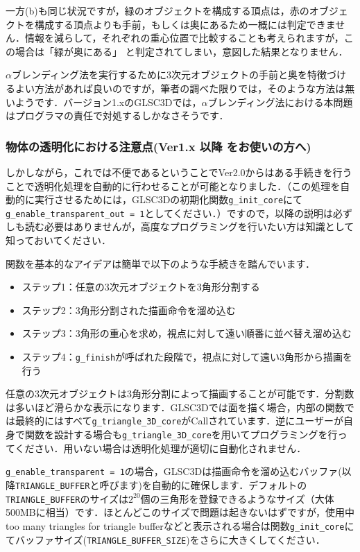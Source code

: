 \documentclass[platex,a4paper,12pt]{jsarticle}%
\begin{document}
一方(b)も同じ状況ですが，緑のオブジェクトを構成する頂点は，赤のオブジェクトを構成する頂点よりも手前，もしくは奥にあるため一概には判定できません．情報を減らして，それぞれの重心位置で比較することも考えられますが，この場合は「緑が奥にある」
と判定されてしまい，意図した結果となりません．

$\alpha$ブレンディング法を実行するために3次元オブジェクトの手前と奥を特徴づけるよい方法があれば良いのですが，筆者の調べた限りでは，そのような方法は無いようです．バージョン1.xのGLSC3Dでは，$\alpha$ブレンディング法における本問題はプログラマの責任で対処するしかなさそうです．

\subsubsection{物体の透明化における注意点(Ver1.x 以降 をお使いの方へ)}

しかしながら，これでは不便であるということでVer2.0からはある手続きを行うことで透明化処理を自動的に行わせることが可能となりました．（この処理を自動的に実行させるためには，GLSC3Dの初期化関数\verb|g_init_core|にて\verb|g_enable_transparent_out = 1|としてください．）ですので，以降の説明は必ずしも読む必要はありませんが，高度なプログラミングを行いたい方は知識として知っておいてください．

関数を基本的なアイデアは簡単で以下のような手続きを踏んでいます．
\begin{itemize}
\item ステップ1：任意の3次元オブジェクトを3角形分割する
\item ステップ2：3角形分割された描画命令を溜め込む
\item ステップ3：3角形の重心を求め，視点に対して遠い順番に並べ替え溜め込む
\item ステップ4：\verb|g_finish|が呼ばれた段階で，視点に対して遠い3角形から描画を行う
\end{itemize}


任意の3次元オブジェクトは3角形分割によって描画することが可能です．分割数は多いほど滑らかな表示になります．GLSC3Dでは面を描く場合，内部の関数では最終的にはすべて\verb|g_triangle_3D_core|がCallされています．逆にユーザーが自身で関数を設計する場合も\verb|g_triangle_3D_core|を用いてプログラミングを行ってください．用いない場合は透明化処理が適切に自動化されません．


\verb|g_enable_transparent = 1|の場合，GLSC3Dは描画命令を溜め込むバッファ(以降\verb|TRIANGLE_BUFFER|と呼びます)を自動的に確保します．デフォルトの\verb|TRIANGLE_BUFFER|のサイズは$2^{20}$個の三角形を登録できるようなサイズ（大体500MBに相当）です．ほとんどこのサイズで問題は起きないはずですが，使用中too many triangles for triangle bufferなどと表示される場合は関数\verb|g_init_core|にてバッファサイズ(\verb|TRIANGLE_BUFFER_SIZE|)をさらに大きくしてください．
\end{document}
